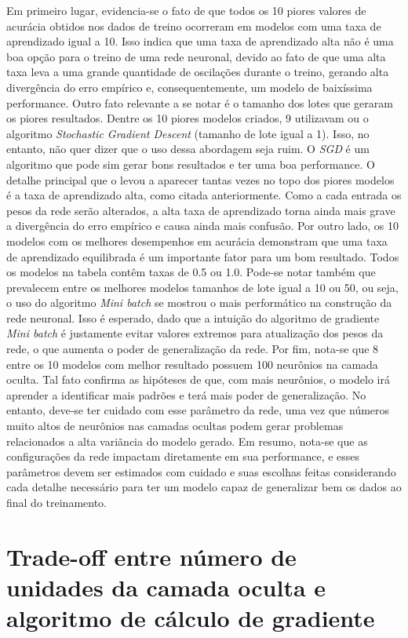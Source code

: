 \documentclass{article}
\begin{document}
Em primeiro lugar, evidencia-se o fato de que todos os 10 piores valores de acurácia obtidos nos dados de treino ocorreram em modelos com uma taxa de aprendizado igual a 10. Isso indica que uma taxa de aprendizado alta não é uma boa opção para o treino de uma rede neuronal, devido ao fato de que uma alta taxa leva a uma grande quantidade de oscilações durante o treino, gerando alta divergência do erro empírico e, consequentemente, um modelo de baixíssima performance.
Outro fato relevante a se notar é o tamanho dos lotes que geraram os piores resultados. Dentre os 10 piores modelos criados, 9 utilizavam ou o algoritmo \textit{Stochastic Gradient Descent} (tamanho de lote igual a 1). Isso, no entanto, não quer dizer que o uso dessa abordagem seja ruim. O \textit{SGD} é um algoritmo que pode sim gerar bons resultados e ter uma boa performance. O detalhe principal que o levou a aparecer tantas vezes no topo dos piores modelos é a taxa de aprendizado alta, como citada anteriormente. Como a cada entrada os pesos da rede serão alterados, a alta taxa de aprendizado torna ainda mais grave a divergência do erro empírico e causa ainda mais confusão.
Por outro lado, os 10 modelos com os melhores desempenhos em acurácia demonstram que uma taxa de aprendizado equilibrada é um importante fator para um bom resultado. Todos os modelos na tabela contêm taxas de 0.5 ou 1.0. Pode-se notar também que prevalecem entre os melhores modelos tamanhos de lote igual a 10 ou 50, ou seja, o uso do algoritmo \textit{Mini batch} se mostrou o mais performático na construção da rede neuronal. Isso é esperado, dado que a intuição do algoritmo de gradiente \textit{Mini batch} é justamente evitar valores extremos para atualização dos pesos da rede, o que aumenta o poder de generalização da rede.
Por fim, nota-se que 8 entre os 10 modelos com melhor resultado possuem 100 neurônios na camada oculta. Tal fato confirma as hipóteses de que, com mais neurônios, o modelo irá aprender a identificar mais padrões e terá mais poder de generalização. No entanto, deve-se ter cuidado com esse parâmetro da rede, uma vez que números muito altos de neurônios nas camadas ocultas podem gerar problemas relacionados a alta variãncia do modelo gerado.
Em resumo, nota-se que as configurações da rede impactam diretamente em sua performance, e esses parâmetros devem ser estimados com cuidado e suas escolhas feitas considerando cada detalhe necessário para ter um modelo capaz de generalizar bem os dados ao final do treinamento.

\section{Trade-off entre número de unidades da camada oculta e algoritmo de cálculo de gradiente}
\end{document}
